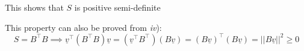 This shows that \(S\) is positive semi-definite

This property can also be proved from \textit{iv}):
\[
    S = B^\intercal B \implies \underline{v}^\intercal(B^\intercal B)\underline{v} = (\underline{v}^\intercal B^\intercal)(B \underline{v}) = (B\underline{v})^\intercal (B\underline{v}) = ||B\underline{v}||^2 \geq 0   
\]